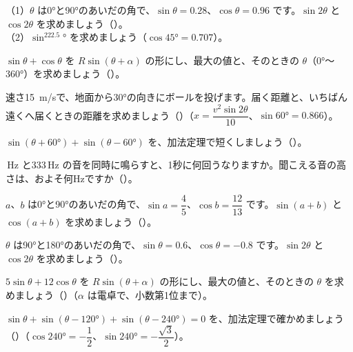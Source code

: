 \bkproblem （1）$\theta$ は0°と90°のあいだの角で、$\sin\theta=0.28$、$\cos\theta=0.96$ です。$\sin2\theta$ と $\cos2\theta$ を求めましょう\mbox{（）}。\\（2）$\sin^222.5°$ を求めましょう（$\cos45°=0.707$）。

\bkproblem $\sin\theta+\cos\theta$ を $R\sin(\theta+\alpha)$ の形にし、最大の値と、そのときの $\theta$（0°〜360°）を求めましょう\mbox{（）}。

\bkproblem 速さ\qty{15}{m/s}で、地面から30°の向きにボールを投げます。届く距離と、いちばん遠くへ届くときの距離を求めましょう\mbox{（）}（$x=\dfrac{v^2\sin2\theta}{10}$、$\sin60°=0.866$）。

\bkproblem $\sin(\theta+60°)+\sin(\theta-60°)$ を、加法定理で短くしましょう\mbox{（）}。

\,Hz と333\,Hz の音を同時に鳴らすと、1秒に何回うなりますか。聞こえる音の高さは、およそ何Hzですか\mbox{（）}。

\bkproblem $a$、$b$ は0°と90°のあいだの角で、$\sin a=\dfrac45$、$\cos b=\dfrac{12}{13}$ です。$\sin(a+b)$ と $\cos(a+b)$ を求めましょう\mbox{（）}。

\bkproblem $\theta$ は90°と180°のあいだの角で、$\sin\theta=0.6$、$\cos\theta=-0.8$ です。$\sin2\theta$ と $\cos2\theta$ を求めましょう\mbox{（）}。


\bkproblem $5\sin\theta+12\cos\theta$ を $R\sin(\theta+\alpha)$ の形にし、最大の値と、そのときの $\theta$ を求めましょう\mbox{（）}（$\alpha$ は電卓で、小数第1位まで）。

\bkproblem $\sin\theta+\sin(\theta-120°)+\sin(\theta-240°)=0$ を、加法定理で確かめましょう\mbox{（）}（$\cos240°=-\dfrac12$、$\sin240°=-\dfrac{\sqrt3}{2}$）。

